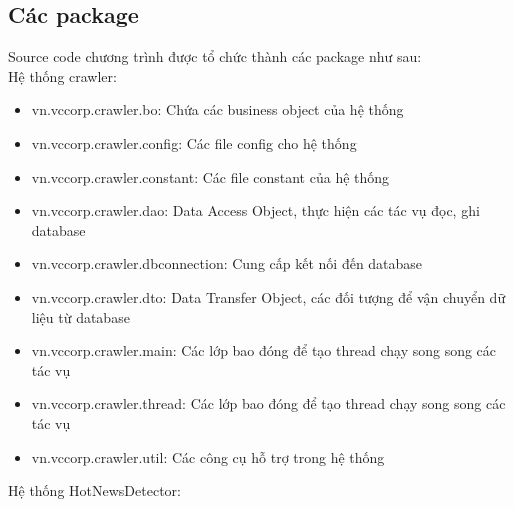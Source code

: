 	\subsection{Các package}
	Source code chương trình được tổ chức thành các package như sau:\\
	Hệ thống crawler:
	\begin{itemize}
		\item vn.vccorp.crawler.bo: Chứa các business object của hệ thống
		\item vn.vccorp.crawler.config: Các file config cho hệ thống
		\item vn.vccorp.crawler.constant: Các file constant của hệ thống
		\item vn.vccorp.crawler.dao: Data Access Object, thực hiện các tác vụ đọc, ghi database
		\item vn.vccorp.crawler.dbconnection: Cung cấp kết nối đến database
		\item vn.vccorp.crawler.dto: Data Transfer Object, các đối tượng để vận chuyển dữ liệu từ database
		\item vn.vccorp.crawler.main: Các lớp bao đóng để tạo thread chạy song song các tác vụ
		\item vn.vccorp.crawler.thread: Các lớp bao đóng để tạo thread chạy song song các tác vụ
		\item vn.vccorp.crawler.util: Các công cụ hỗ trợ trong hệ thống
		
	\end{itemize}
	Hệ thống HotNewsDetector:
